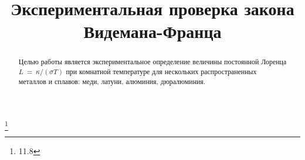 


\title{Экспериментальная проверка закона Видемана-Франца}
\thanks{11.8}



\begin{abstract}
Целью работы является экспериментальное определение величины постоянной Лоренца
$L~=~\kappa /(\sigma T)$ при комнатной температуре для нескольких распространенных металлов и сплавов: меди, латуни, алюминия, дюралюминия.

\end{abstract}


\maketitle

